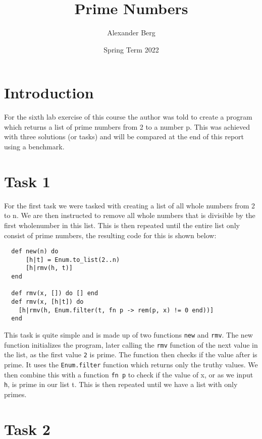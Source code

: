 \documentclass[a4paper,11pt]{article}
\begin{document}
\title{
    \textbf{Prime Numbers}
}
\author{Alexander Berg}
\date{Spring Term 2022}

\maketitle

\section*{Introduction}

For the sixth lab exercise of this course the author was told to create a program which returns a list of prime numbers from 2 to a number p. This was achieved with three solutions (or tasks) and will be compared at the end of this report using a benchmark.

\section*{Task 1}

For the first task we were tasked with creating a list of all whole numbers from 2 to n. We are then instructed to remove all whole numbers that is divisible by the first wholenumber in this list. This is then repeated until the entire list only consist of prime numbers, the resulting code for this is shown below:

\begin{verbatim}
  def new(n) do
      [h|t] = Enum.to_list(2..n)
      [h|rmv(h, t)]
  end

  def rmv(x, []) do [] end
  def rmv(x, [h|t]) do
    [h|rmv(h, Enum.filter(t, fn p -> rem(p, x) != 0 end))]
  end
\end{verbatim}

This task is quite simple and is made up of two functions {\tt new} and {\tt rmv}. The new function initializes the program, later calling the {\tt rmv} function of the next value in the list, as the first value {\tt 2} is prime. The function then checks if the value after is prime. It uses the {\tt Enum.filter} function which returns only the truthy values. We then combine this with a function {\tt fn p} to check if the value of x, or as we input {\tt h}, is prime in our list t. This is then repeated until we have a list with only primes.

\section*{Task 2}
\end{document}
